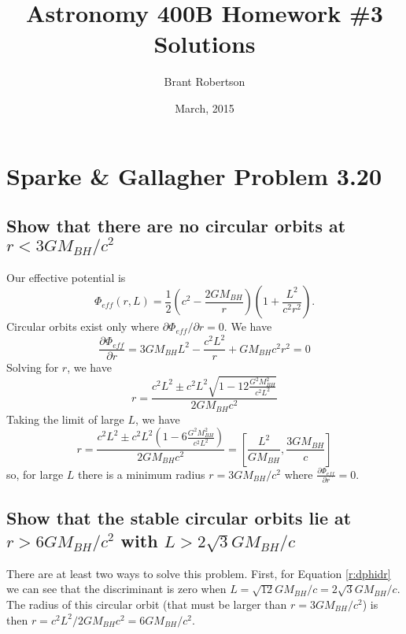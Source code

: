 \documentclass[]{article}
\title{Astronomy 400B Homework \#3 Solutions}
\author{Brant Robertson}
\date{March, 2015}
\begin{document}
\maketitle

\section{Sparke \& Gallagher Problem 3.20}

\subsection{Show that there are no circular orbits at $r<3GM_{BH}/c^2$}

Our effective potential is
\begin{equation}
\Phi_{eff}(r,L) = \frac{1}{2}\left(c^2-\frac{2GM_{BH}}{r}\right)\left(1+ \frac{L^2}{c^2r^2}\right).
\end{equation}
\noindent
Circular orbits exist only where $\partial \Phi_{eff}/\partial r = 0$.  We have
\begin{equation}
\frac{\partial \Phi_{eff}}{\partial r} = 3GM_{BH}L^2 - \frac{c^2L^2}{r} + GM_{BH}c^2r^2 =0
\end{equation}
Solving for $r$, we have
\begin{equation}
\label{r:dphidr}
r = \frac{c^2L^2 \pm c^2 L^2 \sqrt{1-12\frac{G^2M_{BH}^2}{c^2L^2}} }{2GM_{BH}c^2}
\end{equation}
\noindent
Taking the limit of large $L$, we have
\begin{equation}
r = \frac{c^2L^2 \pm c^2 L^2 \left( 1-6 \frac{G^2M_{BH}^2}{c^2L^2}\right) }{2GM_{BH}c^2} = \left[\frac{L^2}{GM_{BH}}, \frac{3GM_{BH}}{c}\right]
\end{equation}
\noindent
so, for large $L$ there is a minimum radius $r = 3GM_{BH}/c^2$ where $\frac{\partial \Phi_{eff}}{\partial r}=0$.

\subsection{Show that the stable circular orbits lie at $r>6GM_{BH}/c^2$ with $L>2\sqrt{3}GM_{BH}/c$}

There are at least two ways to solve this problem.  First, for Equation \ref{r:dphidr} 
we can see that the discriminant is zero when $L = \sqrt{12}GM_{BH}/c = 2 \sqrt{3} G M_{BH}/c$.
The radius of this circular orbit (that must be larger than $r = 3 GM_{BH}/c^2$) is then $r = c^2 L^2 / 2 GM_{BH} c^2 = 6 G M_{BH} / c^2$.
\end{document}
